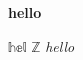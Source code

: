\documentclass{article}
\begin{document}
\textbf{hello}

$\mathbb{hel}$
$\mathbb{Z}$
\em{hello}
\end{document}
